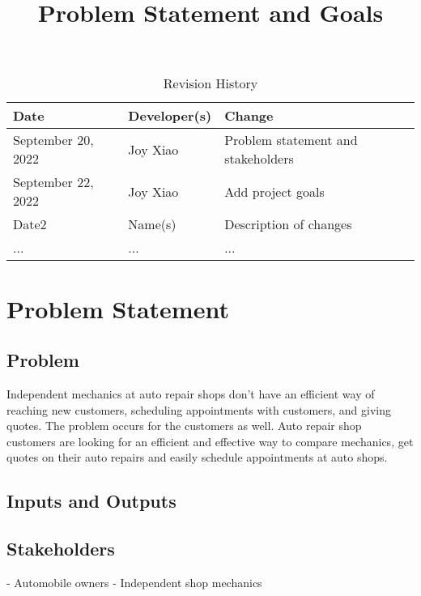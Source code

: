 \documentclass{article}
\title{Problem Statement and Goals\\\progname}
\author{\authname}
\date{}
\begin{document}
\maketitle

\begin{table}[hp]
\caption{Revision History} \label{TblRevisionHistory}
\begin{tabularx}{\textwidth}{llX}
\toprule
\textbf{Date} & \textbf{Developer(s)} & \textbf{Change}\\
\midrule
September 20, 2022 & Joy Xiao & Problem statement and stakeholders\\
September 22, 2022 & Joy Xiao & Add project goals\\
Date2 & Name(s) & Description of changes\\
... & ... & ...\\
\bottomrule
\end{tabularx}
\end{table}

\section{Problem Statement}


\subsection{Problem}
Independent mechanics at auto repair shops don't have an efficient way of reaching new customers, scheduling appointments with customers, and giving quotes. The problem occurs for the customers as well. Auto repair shop customers are looking for an efficient and effective way to compare mechanics, get quotes on their auto repairs and easily schedule appointments at auto shops.

\subsection{Inputs and Outputs}


\subsection{Stakeholders}
- Automobile owners
- Independent shop mechanics
\end{document}
